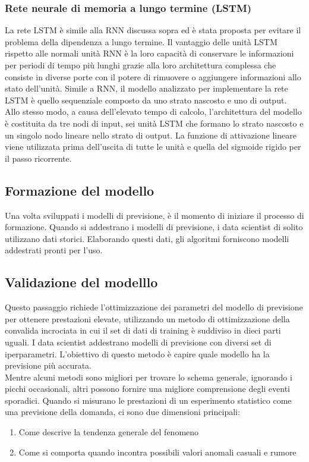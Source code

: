 \documentclass[12pt,a4paper]{report}
\begin{document}
\subsubsection{Rete neurale di memoria a lungo termine (LSTM)}
La rete LSTM è simile alla RNN discussa sopra ed è stata proposta per evitare il problema della dipendenza a lungo termine. Il vantaggio delle unità LSTM rispetto alle normali unità RNN è la loro capacità di conservare le informazioni per periodi di tempo più lunghi grazie alla loro architettura complessa che consiste in diverse porte con il potere di rimuovere o aggiungere informazioni allo stato dell'unità.
Simile a RNN, il modello analizzato per implementare la rete LSTM è quello sequenziale composto da uno strato nascosto e uno di output. Allo stesso modo, a causa dell'elevato tempo di calcolo, l'architettura del modello è costituita da tre nodi di input, sei unità LSTM che formano lo strato nascosto e un singolo nodo lineare nello strato di output. La funzione di attivazione lineare viene utilizzata prima dell'uscita di tutte le unità e quella del sigmoide rigido per il passo ricorrente. 

\subsection{Formazione del modello}
Una volta sviluppati i modelli di previsione, è il momento di iniziare il processo di formazione. Quando si addestrano i modelli di previsione, i data scientist di solito utilizzano dati storici. Elaborando questi dati, gli algoritmi forniscono modelli addestrati pronti per l'uso.


\subsection{Validazione del modelllo}
Questo passaggio richiede l'ottimizzazione dei parametri del modello di previsione per ottenere prestazioni elevate, utilizzando un metodo di ottimizzazione della convalida incrociata in cui il set di dati di training è suddiviso in dieci parti uguali. I data scientist addestrano modelli di previsione con diversi set di iperparametri. L'obiettivo di questo metodo è capire quale modello ha la previsione più accurata.\\
Mentre alcuni metodi sono migliori per trovare lo schema generale, ignorando i picchi occasionali, altri possono fornire una migliore comprensione degli eventi sporadici. Quando si misurano le prestazioni di un esperimento statistico come una previsione della domanda, ci sono due dimensioni principali:
\begin{enumerate}
    \item Come descrive la tendenza generale del fenomeno
    \item Come si comporta quando incontra possibili valori anomali casuali e rumore
\end{enumerate}
\end{document}
